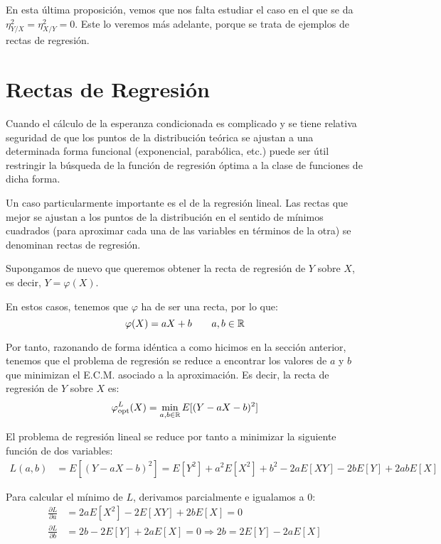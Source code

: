 En esta última proposición, vemos que nos falta estudiar el caso en el que se da $\eta_{Y/X}^2 = \eta_{X/Y}^2 = 0$. Este lo veremos más adelante, porque se trata de ejemplos de rectas de regresión.


\section{Rectas de Regresión}

Cuando el cálculo de la esperanza condicionada es complicado y se tiene relativa seguridad de que los puntos de la distribución teórica se ajustan a una determinada forma funcional (exponencial, parabólica, etc.) puede ser útil restringir la búsqueda de la función de regresión óptima a la clase de funciones de dicha forma.

Un caso particularmente importante es el de la regresión lineal. Las rectas que mejor se ajustan a los puntos de la distribución en el sentido de mínimos cuadrados (para aproximar cada una de las variables en términos de la otra) se denominan rectas de regresión.

\begin{observacion}
    Supongamos de nuevo que queremos obtener la recta de regresión de $Y$ sobre $X$, es decir, $Y=\varphi(X)$.
\end{observacion}

En estos casos, tenemos que $\varphi$ ha de ser una recta, por lo que:
\begin{equation*}
    \varphi(X) = aX + b\qquad a,b\in\mathbb{R}
\end{equation*}

Por tanto, razonando de forma idéntica a como hicimos en la sección anterior, tenemos que el problema de regresión se reduce a encontrar los valores de $a$ y $b$ que minimizan el E.C.M. asociado a la aproximación. Es decir, la recta de regresión de $Y$ sobre $X$ es:
\begin{equation*}
    \varphi_{\text{opt}}^L(X) = \min_{a,b\in\mathbb{R}} E[(Y - aX - b)^2]
\end{equation*}

El problema de regresión lineal se reduce por tanto a minimizar la siguiente función de dos variables:
\begin{align*}
    L(a,b) &= E[(Y - aX - b)^2]
    = E[Y^2] + a^2E[X^2] + b^2 - 2aE[XY] - 2bE[Y] + 2abE[X]
\end{align*}

Para calcular el mínimo de $L$, derivamos parcialmente e igualamos a 0:
\begin{align*}
    \frac{\partial L}{\partial a} &= 2aE[X^2] - 2E[XY] + 2bE[X] = 0\\
    \frac{\partial L}{\partial b} &= 2b - 2E[Y] + 2aE[X] = 0 \Longrightarrow
    2b = 2E[Y] - 2aE[X]
\end{align*}


